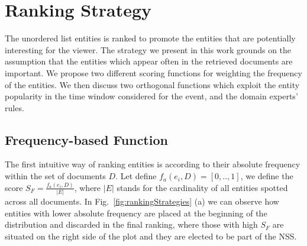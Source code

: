 \documentclass{llncs}
\begin{document}
\section{Ranking Strategy}
\label{sec:Ranking}
The unordered list entities is ranked to promote the entities that are potentially interesting for the viewer. The strategy we present in this work grounds on the assumption that the entities which appear often in the retrieved documents are important. We propose two different scoring functions for weighting the frequency of the entities. We then discuss two orthogonal functions which exploit the entity popularity in the time window considered for the event, and the domain experts' rules.

\subsection{Frequency-based Function}
The first intuitive way of ranking entities is according to their absolute frequency within the set of documents $D$. Let define $f_a(e_i, D)=[0,..,1]$, we define the score $S_F = \frac{ f_a(e_i, D) }{ |E| } $, where $|E|$ stands for the cardinality of all entities spotted across all documents. 
In Fig.~\ref{fig:rankingStrategies} (a) we can observe how entities with lower absolute frequency are placed at the beginning of the distribution and discarded in the final ranking, where those with high $S_F$ are situated on the right side of the plot and they are elected to be part of the NSS.
\end{document}
